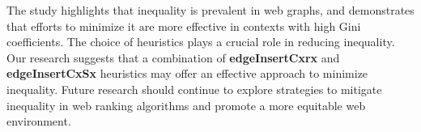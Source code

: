 The study highlights that inequality is prevalent in web graphs, and demonstrates that efforts to minimize it are more effective in contexts with high Gini coefficients. The choice of heuristics plays a crucial role in reducing inequality. Our research suggests that a combination of \textbf{edgeInsertCxrx} and \textbf{edgeInsertCxSx} heuristics may offer an effective approach to minimize inequality. Future research should continue to explore strategies to mitigate inequality in web ranking algorithms and promote a more equitable web environment.
